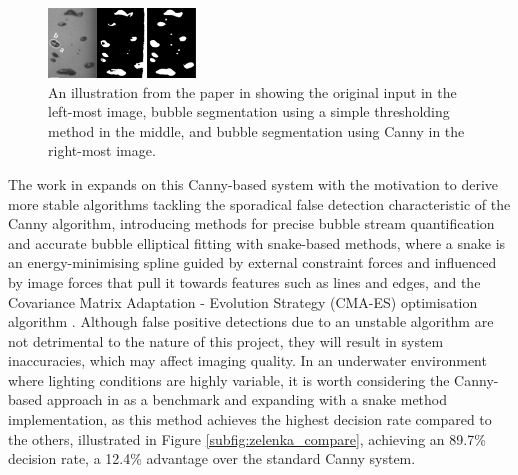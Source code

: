 \begin{figure}[h]
    \centering
    \includegraphics[width=0.35\textwidth]{assets/bubble-segmentation-canny-thresholding.png}
    \caption{An illustration from the paper in \cite{thomanekAutomatedGasBubble2010} showing the original input in the left-most image, bubble segmentation using a simple thresholding method in the middle, and bubble segmentation using Canny in the right-most image.}
    \label{fig:bubble_segment_canny}
\end{figure}

The work in \cite{zelenkaGasBubbleShape2014} expands on this Canny-based system with the motivation to derive more stable algorithms tackling the sporadical false detection characteristic of the Canny algorithm, introducing methods for precise bubble stream quantification and accurate bubble elliptical fitting with snake-based methods, where a snake is an energy-minimising spline guided by external constraint forces and influenced by image forces that pull it towards features such as lines and edges, and the Covariance Matrix Adaptation - Evolution Strategy (CMA-ES) optimisation algorithm \cite{hansenEvaluatingCMAEvolution2004}. Although false positive detections due to an unstable algorithm are not detrimental to the nature of this project, they will result in system inaccuracies, which may affect imaging quality. In an underwater environment where lighting conditions are highly variable, it is worth considering the Canny-based approach in \cite{zelenkaGasBubbleShape2014} as a benchmark and expanding with a snake method implementation, as this method achieves the highest decision rate compared to the others, illustrated in Figure \ref{subfig:zelenka_compare}, achieving an 89.7\% decision rate, a 12.4\% advantage over the standard Canny system.

